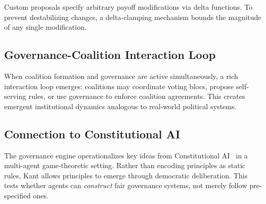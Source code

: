 Custom proposals specify arbitrary payoff modifications via delta functions.
To prevent destabilizing changes, a delta-clamping mechanism bounds the
magnitude of any single modification.


\subsection{Governance-Coalition Interaction Loop}
\label{sec:gov-coalition}

When coalition formation and governance are active simultaneously, a rich
interaction loop emerges: coalitions may coordinate voting blocs, propose
self-serving rules, or use governance to enforce coalition agreements. This
creates emergent institutional dynamics analogous to real-world political
systems.


\subsection{Connection to Constitutional AI}
\label{sec:constitutional-ai}

The governance engine operationalizes key ideas from Constitutional
AI~\citep{bai2022constitutional} in a multi-agent game-theoretic setting.
Rather than encoding principles as static rules, Kant allows principles to
emerge through democratic deliberation. This tests whether agents can
\emph{construct} fair governance systems, not merely follow pre-specified ones.

